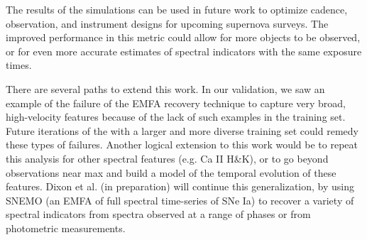 The results of the simulations can be used in future work to optimize cadence, observation, and instrument designs for upcoming supernova surveys. The improved performance in this metric could allow for more objects to be observed, or for even more accurate estimates of spectral indicators with the same exposure times. 

There are several paths to extend this work. In our validation, we saw an example of the failure of the EMFA recovery technique to capture very broad, high-velocity features because of the lack of such examples in the training set. Future iterations of the with a larger and more diverse training set could remedy these types of failures. Another logical extension to this work would be to repeat this analysis for other spectral features (e.g. Ca II H\&K), or to go beyond observations near max and build a model of the temporal evolution of these features. Dixon et al. (in preparation) will continue this generalization, by using SNEMO \citep{saunders_snemo_2018} (an EMFA of full spectral time-series of SNe Ia) to recover a variety of spectral indicators from spectra observed at a range of phases or from photometric measurements.
